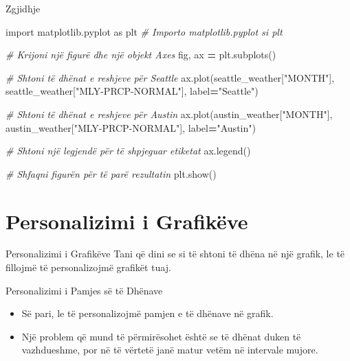 \documentclass[
  ignorenonframetext,
]{beamer}
\newenvironment{Shaded}{\begin{snugshade}}{\end{snugshade}}
\newcommand{\CommentTok}[1]{\textcolor[rgb]{0.56,0.35,0.01}{\textit{#1}}}
\newcommand{\ImportTok}[1]{#1}
\newcommand{\NormalTok}[1]{#1}
\newcommand{\OperatorTok}[1]{\textcolor[rgb]{0.81,0.36,0.00}{\textbf{#1}}}
\newcommand{\StringTok}[1]{\textcolor[rgb]{0.31,0.60,0.02}{#1}}
\begin{document}
\begin{frame}[fragile]{Zgjidhje}
\protect\hypertarget{zgjidhje-1}{}

\begin{Shaded}
\begin{Highlighting}[]
\ImportTok{import}\NormalTok{ matplotlib.pyplot }\ImportTok{as}\NormalTok{ plt  }\CommentTok{\# Importo matplotlib.pyplot si plt}

\CommentTok{\# Krijoni një figurë dhe një objekt Axes}
\NormalTok{fig, ax }\OperatorTok{=}\NormalTok{ plt.subplots()}

\CommentTok{\# Shtoni të dhënat e reshjeve për Seattle}
\NormalTok{ax.plot(seattle\_weather[}\StringTok{"MONTH"}\NormalTok{], seattle\_weather[}\StringTok{"MLY{-}PRCP{-}NORMAL"}\NormalTok{], label}\OperatorTok{=}\StringTok{"Seattle"}\NormalTok{)}

\CommentTok{\# Shtoni të dhënat e reshjeve për Austin}
\NormalTok{ax.plot(austin\_weather[}\StringTok{"MONTH"}\NormalTok{], austin\_weather[}\StringTok{"MLY{-}PRCP{-}NORMAL"}\NormalTok{], label}\OperatorTok{=}\StringTok{"Austin"}\NormalTok{)}

\CommentTok{\# Shtoni një legjendë për të shpjeguar etiketat}
\NormalTok{ax.legend()}

\CommentTok{\# Shfaqni figurën për të parë rezultatin}
\NormalTok{plt.show()}
\end{Highlighting}
\end{Shaded}
\end{frame}

\hypertarget{personalizimi-i-grafikuxebve}{%
\section{Personalizimi i Grafikëve}\label{personalizimi-i-grafikuxebve}}

\begin{frame}{Personalizimi i Grafikëve}
\protect\hypertarget{personalizimi-i-grafikuxebve-1}{}
Tani që dini se si të shtoni të dhëna në një grafik, le të fillojmë të
personalizojmë grafikët tuaj.
\end{frame}

\begin{frame}{Personalizimi i Pamjes së të Dhënave}
\protect\hypertarget{personalizimi-i-pamjes-suxeb-tuxeb-dhuxebnave}{}
\begin{itemize}
\item
  Së pari, le të personalizojmë pamjen e të dhënave në grafik.
\item
  Një problem që mund të përmirësohet është se të dhënat duken të
  vazhdueshme, por në të vërtetë janë matur vetëm në intervale mujore.
\end{itemize}
\end{frame}
\end{document}
